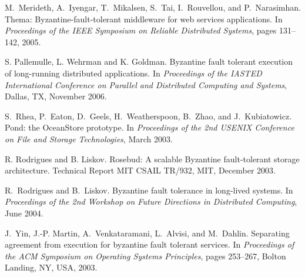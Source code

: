 \documentclass[times, 10pt, twocolumn]{article}
\begin{document}
\begin{thebibliography}{10}
M.~Merideth, A.~Iyengar, T.~Mikalsen, S.~Tai, I.~Rouvellou, and P.~Narasimhan.
\newblock Thema: Byzantine-fault-tolerant middleware for web services
  applications.
\newblock In {\em Proceedings of the IEEE Symposium on Reliable Distributed
  Systems}, pages 131--142, 2005.

S. Pallemulle, L. Wehrman and K. Goldman. Byzantine fault tolerant
execution of long-running distributed applications. In {\em Proceedings
of the IASTED International Conference on Parallel and Distributed 
Computing and Systems}, Dallas, TX, November 2006.

S.~Rhea, P.~Eaton, D.~Geels, H.~Weatherspoon, B.~Zhao, and J.~Kubiatowicz.
\newblock Pond: the {OceanStore} prototype.
\newblock In {\em Proceedings of the 2nd USENIX Conference on File and Storage
  Technologies}, March 2003.

R. Rodrigues and B. Liskov. 
\newblock Rosebud: A scalable Byzantine fault-tolerant storage architecture. 
\newblock Technical Report MIT CSAIL TR/932, MIT, December 2003.

R.~Rodrigues and B.~Liskov.
\newblock Byzantine fault tolerance in long-lived systems.
\newblock In {\em Proceedings of the 2nd Workshop on Future Directions in 
Distributed Computing}, June 2004.

J.~Yin, J.-P. Martin, A.~Venkataramani, L.~Alvisi, and M.~Dahlin.
\newblock Separating agreement from execution for byzantine fault tolerant
  services.
\newblock In {\em Proceedings of the ACM Symposium on Operating Systems
  Principles}, pages 253--267, Bolton Landing, NY, USA, 2003.

\end{thebibliography}
\end{document}
